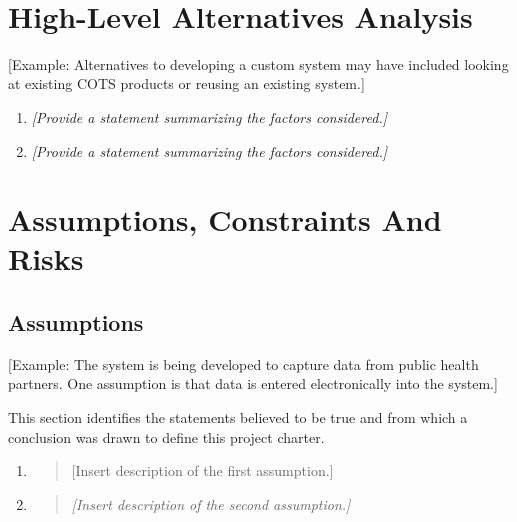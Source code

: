 \documentclass[a4paper, 11pt]{article}
\begin{document}
\emph{\\
}

\hypertarget{high-level-alternatives-analysis}{%
\section{High-Level Alternatives Analysis}\label{high-level-alternatives-analysis}}

{[}Example: Alternatives to developing a custom system may have included
looking at existing COTS products or reusing an existing system.{]}

\begin{enumerate}
\def\labelenumi{\arabic{enumi}.}
\item
  \emph{{[}Provide a statement summarizing the factors considered.{]}}
\item
  \emph{{[}Provide a statement summarizing the factors considered.{]}}
\end{enumerate}

\hypertarget{assumptions-constraints-and-risks}{%
\section{Assumptions, Constraints And Risks}\label{assumptions-constraints-and-risks}}

\hypertarget{assumptions}{%
\subsection{Assumptions}\label{assumptions}}

{[}Example: The system is being developed to capture data from public
health partners. One assumption is that data is entered electronically
into the system.{]}

This section identifies the statements believed to be true and from
which a conclusion was drawn to define this project charter.

\begin{enumerate}
\def\labelenumi{\arabic{enumi}.}
\item
  \begin{quote}
  {[}Insert description of the first assumption.{]}
  \end{quote}
\item
  \begin{quote}
  \emph{{[}Insert description of the second assumption.{]}}
  \end{quote}
\end{enumerate}
\end{document}
